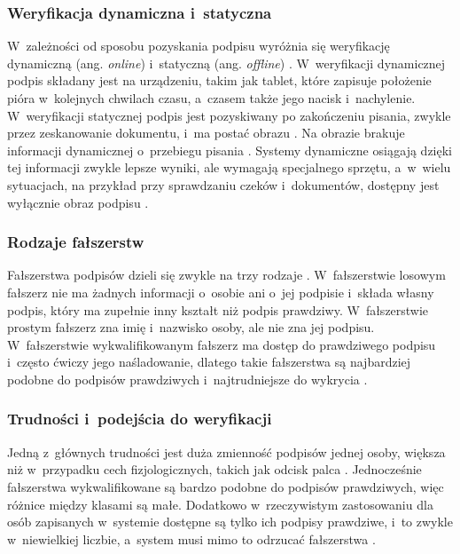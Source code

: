 \documentclass[12pt, twoside, openright]{article}
\begin{document}
\subsubsection*{Weryfikacja dynamiczna i~statyczna}

W~zależności od sposobu pozyskania podpisu wyróżnia się weryfikację dynamiczną (ang. \textit{online}) i~statyczną (ang. \textit{offline}) \cite{hafemann2017review}.
W~weryfikacji dynamicznej podpis składany jest na urządzeniu, takim jak tablet, które zapisuje położenie pióra w~kolejnych chwilach czasu, a~czasem także jego nacisk i~nachylenie.
W~weryfikacji statycznej podpis jest pozyskiwany po zakończeniu pisania, zwykle przez zeskanowanie dokumentu, i~ma postać obrazu \cite{hafemann2017review}.
Na obrazie brakuje informacji dynamicznej o~przebiegu pisania \cite{kalera2004}.
Systemy dynamiczne osiągają dzięki tej informacji zwykle lepsze wyniki, ale wymagają specjalnego sprzętu, a~w~wielu sytuacjach, na przykład przy sprawdzaniu czeków i~dokumentów, dostępny jest wyłącznie obraz podpisu \cite{dey2017}.

\subsubsection*{Rodzaje fałszerstw}

Fałszerstwa podpisów dzieli się zwykle na trzy rodzaje \cite{hafemann2017review}.
W~fałszerstwie losowym fałszerz nie ma żadnych informacji o~osobie ani o~jej podpisie i~składa własny podpis, który ma zupełnie inny kształt niż podpis prawdziwy.
W~fałszerstwie prostym fałszerz zna imię i~nazwisko osoby, ale nie zna jej podpisu.
W~fałszerstwie wykwalifikowanym fałszerz ma dostęp do prawdziwego podpisu i~często ćwiczy jego naśladowanie, dlatego takie fałszerstwa są najbardziej podobne do podpisów prawdziwych i~najtrudniejsze do wykrycia \cite{hafemann2017review}.

\subsubsection*{Trudności i~podejścia do weryfikacji}

Jedną z~głównych trudności jest duża zmienność podpisów jednej osoby, większa niż w~przypadku cech fizjologicznych, takich jak odcisk palca \cite{hafemann2017review}.
Jednocześnie fałszerstwa wykwalifikowane są bardzo podobne do podpisów prawdziwych, więc różnice między klasami są małe.
Dodatkowo w~rzeczywistym zastosowaniu dla osób zapisanych w~systemie dostępne są tylko ich podpisy prawdziwe, i~to zwykle w~niewielkiej liczbie, a~system musi mimo to odrzucać fałszerstwa \cite{hafemann2017review}.
\end{document}
